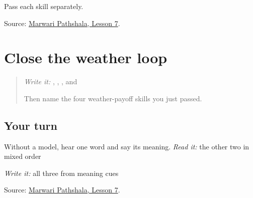 Pass each skill separately.

\begin{tcolorbox}[breakable,colback=teal!4,colframe=teal!35!black,title={Before you move on}]
Source: \href{https://www.marwaripathshala.com/marwari-lesson-7-english}{Marwari Pathshala, Lesson 7}.
\end{tcolorbox}
\section[Practice]{Close the weather loop}

\label{lesson:MW-R11-weather-close}



\begin{quote}
\emph{Write it:} \textbf{}, \textbf{}, \textbf{}, and \textbf{}

Then name the four weather-payoff skills you just passed.
\end{quote}

\subsection*{Your turn}
Without a model, hear one word and say its meaning. \emph{Read it:} the other two in mixed order

\emph{Write it:} all three from meaning cues

\begin{tcolorbox}[breakable,colback=teal!4,colframe=teal!35!black,title={Before you move on}]
Source: \href{https://www.marwaripathshala.com/marwari-lesson-7-english}{Marwari Pathshala, Lesson 7}.
\end{tcolorbox}
